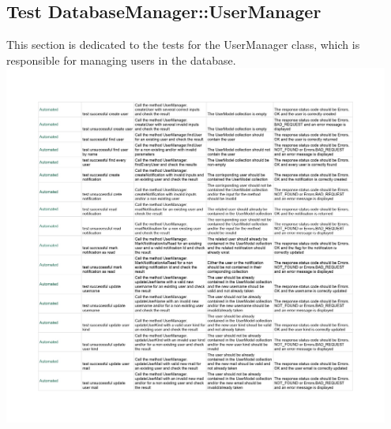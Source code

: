\documentclass{article}
\begin{document}
\subsection*{Test DatabaseManager::UserManager}
This section is dedicated to the tests for the UserManager class, which is responsible for managing users in the database.
\newline
\includegraphics[width=0.95\textwidth]{images/Test_DatabaseManagerUserManager.jpg}
\end{document}
